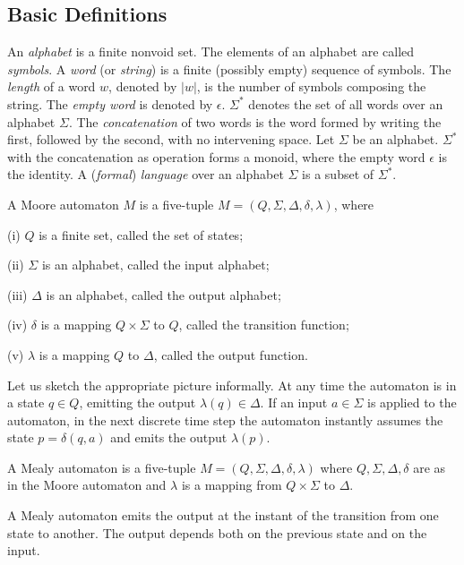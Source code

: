 \subsection{Basic Definitions}

An {\em alphabet} is a finite nonvoid set.
The elements of an alphabet are called {\em symbols}.
A {\em word} (or {\em string}) is a finite (possibly empty) sequence of
symbols.
The {\em length} of a word $w$, denoted by $|w|$, is the number of symbols
composing the string.
The {\em empty word} is denoted by $\epsilon$.
$\Sigma^*$ denotes the set of all words over an alphabet $\Sigma$.
The {\em concatenation} of two words is the word formed by writing
the first, followed by the second, with no intervening space.
Let $\Sigma$ be an alphabet.
$\Sigma^*$ with the concatenation as operation forms a monoid,
where the empty word $\epsilon$ is the identity.
A ({\em formal}) {\em language} over an alphabet $\Sigma$ is a
subset of $\Sigma^*$.

\begin{defin}
\label{moore}
A Moore automaton $M$ is a five-tuple $M=(Q,\Sigma,\Delta,\delta,\lambda)$,
where

(i) $Q$ is a finite set, called the set of states;

(ii) $\Sigma$ is an alphabet, called the input alphabet;

(iii) $\Delta$ is an alphabet, called the output alphabet;

(iv) $\delta$ is a mapping $Q \times \Sigma$ to $Q$, called
the transition function;

(v) $\lambda$ is a mapping $Q$ to $\Delta$, called the output function.
\end{defin}

Let us sketch the appropriate picture informally.
At any time the automaton is in a state $q \in Q$,
emitting the output $\lambda(q) \in \Delta$.
If an input $a \in \Sigma$ is applied to the automaton,
in the next discrete time step
the automaton instantly assumes the state $p = \delta(q,a)$ and emits
the output $\lambda(p)$.

\begin{defin}
A Mealy automaton is a five-tuple $M=(Q,\Sigma,\Delta,\delta,\lambda)$
where $Q,\Sigma,\Delta,\delta$ are as in the Moore automaton and
$\lambda$ is a mapping from $Q \times \Sigma$ to $\Delta$.
\end{defin}

A Mealy automaton emits the output at the instant of the transition
from one state to another. The output depends both on the previous
state and on the input.

